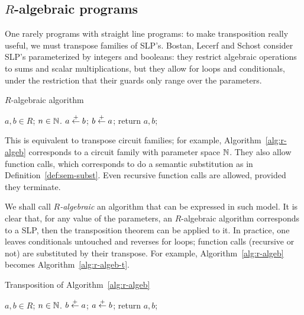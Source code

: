 \subsection{$R$-algebraic programs}
\label{sec:r-algebraic-programs}
One rarely programs with straight line programs: to make transposition
really useful, we must transpose families of SLP's. Bostan, Lecerf and
Schost consider SLP's parameterized by integers and booleans: they
restrict algebraic operations to sums and scalar multiplications, but
they allow for loops and conditionals, under the restriction that
their guards only range over the parameters.

\begin{algorithm}
  \caption{\label{alg:r-algeb}$R$-algebraic algorithm}
  \begin{algorithmic}
    \REQUIRE $a,b\in R$; $n\in\mathbb{N}$.
    \STATE $a \overset{+}{\leftarrow} b$;
    \ELSE
    \STATE $b \overset{+}{\leftarrow} a$;
    \ENDIF
    \ENDFOR
    \STATE return $a,b$;
  \end{algorithmic}
\end{algorithm}

This is equivalent to transpose circuit families; for example,
Algorithm~\ref{alg:r-algeb} corresponds to a circuit family with
parameter space $\mathbb{N}$. They also allow function calls, which
corresponds to do a semantic substitution as in
Definition~\ref{def:sem-subst}. Even recursive function calls are
allowed, provided they terminate.

We shall call
\emph{$R$-algebraic}
an algorithm that can be expressed in such model. It is clear that,
for any value of the parameters, an $R$-algebraic algorithm
corresponds to a SLP, then the transposition theorem can be applied to
it. In practice, one leaves conditionals untouched and reverses for
loops; function calls (recursive or not) are substituted by their
transpose. For example, Algorithm~\ref{alg:r-algeb} becomes
Algorithm~\ref{alg:r-algeb-t}.

\begin{algorithm}
  \caption{\label{alg:r-algeb-t}Transposition of
    Algorithm~\ref{alg:r-algeb}}
  \begin{algorithmic}
    \REQUIRE $a,b\in R$; $n\in\mathbb{N}$.
    \STATE $b \overset{+}{\leftarrow} a$;
    \ELSE
    \STATE $a \overset{+}{\leftarrow} b$;
    \ENDIF
    \ENDFOR
    \STATE return $a,b$;
  \end{algorithmic}
\end{algorithm}

